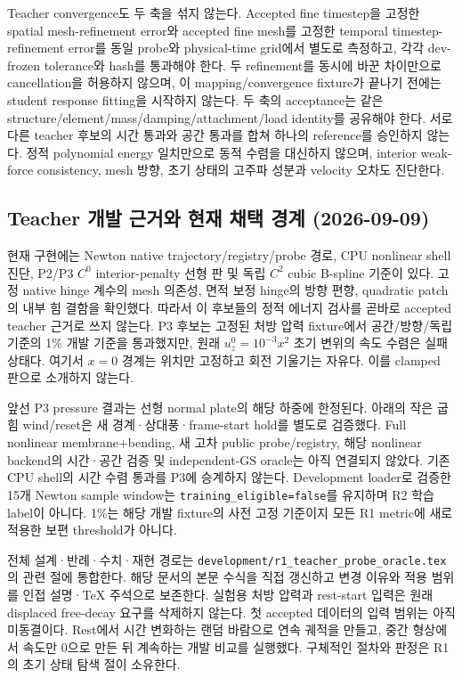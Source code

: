 \documentclass[11pt]{article}
\newcommand{\code}[1]{{\small\nolinkurl{#1}}}
\begin{document}
Teacher convergence도 두 축을 섞지 않는다. Accepted fine timestep을 고정한 spatial mesh-refinement
error와 accepted fine mesh를 고정한 temporal timestep-refinement error를 동일 probe와 physical-time
grid에서 별도로 측정하고, 각각 dev-frozen tolerance와 hash를 통과해야 한다. 두 refinement를 동시에
바꾼 차이만으로 cancellation을 허용하지 않으며, 이 mapping/convergence fixture가 끝나기 전에는
student response fitting을 시작하지 않는다.
두 축의 acceptance는 같은 structure/element/mass/damping/attachment/load identity를 공유해야 한다.
서로 다른 teacher 후보의 시간 통과와 공간 통과를 합쳐 하나의 reference를 승인하지 않는다.
정적 polynomial energy 일치만으로 동적 수렴을 대신하지 않으며, interior weak-force consistency,
mesh 방향, 초기 상태의 고주파 성분과 velocity 오차도 진단한다.

\subsection{Teacher 개발 근거와 현재 채택 경계 (2026-09-09)}
\label{sec:rd-teacher-development-evidence}

현재 구현에는 Newton native trajectory/registry/probe 경로, CPU nonlinear shell 진단,
P2/P3 \(C^0\) interior-penalty 선형 판 및 독립 \(C^2\) cubic B-spline 기준이 있다.
고정 native hinge 계수의 mesh 의존성, 면적 보정 hinge의 방향 편향, quadratic patch의 내부 힘
결함을 확인했다. 따라서 이 후보들의 정적 에너지 검사를 곧바로 accepted teacher 근거로 쓰지 않는다.
P3 후보는 고정된 처방 압력 fixture에서 공간/방향/독립 기준의 1\% 개발 기준을 통과했지만,
원래 \(u_z^0=10^{-3}x^2\) 초기 변위의 속도 수렴은 실패 상태다.
여기서 \(x=0\) 경계는 위치만 고정하고 회전 기울기는 자유다. 이를 clamped 판으로 소개하지 않는다.

앞선 P3 pressure 결과는 선형 normal plate의 해당 하중에 한정된다. 아래의 작은 굽힘 wind/reset은
새 경계·상대풍·frame-start hold를 별도로 검증했다. Full nonlinear membrane+bending,
새 고차 public probe/registry, 해당 nonlinear backend의 시간·공간 검증 및 independent-GS oracle는
아직 연결되지 않았다. 기존 CPU shell의 시간 수렴 통과를 P3에
승계하지 않는다. Development loader로 검증한 15개 Newton sample window는
\code{training_eligible=false}를 유지하며 R2 학습 label이 아니다.
1\%는 해당 개발 fixture의 사전 고정 기준이지 모든 R1 metric에 새로 적용한 보편 threshold가 아니다.

전체 설계·반례·수치·재현 경로는 \code{development/r1_teacher_probe_oracle.tex}의 관련 절에 통합한다.
해당 문서의 본문 수식을 직접 갱신하고 변경 이유와 적용 범위를 인접 설명·TeX 주석으로 보존한다.
실험용 처방 압력과 rest-start 입력은 원래 displaced free-decay 요구를 삭제하지 않는다.
첫 accepted 데이터의 입력 범위는 아직 미동결이다. Rest에서 시간 변화하는 랜덤 바람으로
연속 궤적을 만들고, 중간 형상에서 속도만 0으로 만든 뒤 계속하는 개발 비교를 실행했다.
구체적인 절차와 판정은 R1의 초기 상태 탐색 절이 소유한다.
\end{document}
